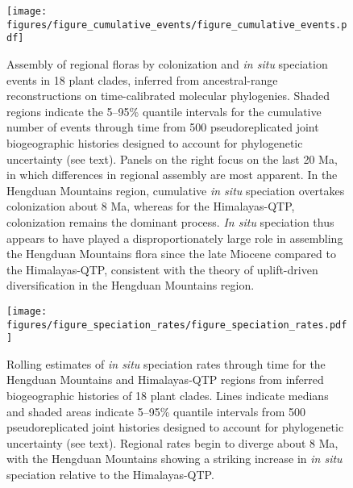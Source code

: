 \documentclass[12pt]{article}
\begin{document}
\raggedright
\parindent 0.5in




%




\begin{figure}
\begin{center}
\texttt{[image: figures/figure\_cumulative\_events/figure\_cumulative\_events.pdf]}
\end{center}
\caption{Assembly of regional floras by colonization and \textit{in situ} speciation events in 18 plant clades, inferred from ancestral-range reconstructions on time-calibrated molecular phylogenies. Shaded regions indicate the 5--95\% quantile intervals for the cumulative number of events through time from 500 pseudoreplicated joint biogeographic histories designed to account for phylogenetic uncertainty (see text). Panels on the right focus on the last 20 Ma, in which differences in regional assembly are most apparent. In the Hengduan Mountains region, cumulative \textit{in situ} speciation overtakes colonization about 8 Ma, whereas for the Himalayas-QTP, colonization remains the dominant process. \textit{In situ} speciation thus appears to have played a disproportionately large role in assembling the Hengduan Mountains flora since the late Miocene compared to the Himalayas-QTP, consistent with the theory of uplift-driven diversification in the Hengduan Mountains region.}
\label{fig:cumevents}
\end{figure}

\begin{figure}
\begin{center}
\texttt{[image: figures/figure\_speciation\_rates/figure\_speciation\_rates.pdf]}
\end{center}
\caption{Rolling estimates of \textit{in situ} speciation rates through time for the Hengduan Mountains and Himalayas-QTP regions from inferred biogeographic histories of 18 plant clades. Lines indicate medians and shaded areas indicate 5--95\% quantile intervals from 500 pseudoreplicated joint histories designed to account for phylogenetic uncertainty (see text). Regional rates begin to diverge about 8 Ma, with the Hengduan Mountains showing a striking increase in \textit{in situ} speciation relative to the Himalayas-QTP.}
\label{fig:speciation}
\end{figure}
\end{document}
